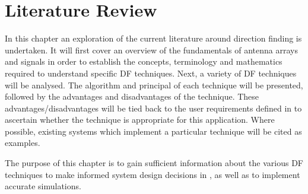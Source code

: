 \chapter{Literature Review}
\label{ch:lit-review}
In this chapter an exploration of the current literature around direction finding is undertaken.
It will first cover an overview of the fundamentals of antenna arrays and signals in order to establish the concepts, terminology and mathematics required to understand specific DF techniques. 
Next, a variety of DF techniques will be analysed. The algorithm and principal of each technique will be presented, followed by the advantages and disadvantages of the technique. 
These advantages/disadvantages will be tied back to the user requirements defined in  to ascertain whether the technique is appropriate for this application. Where possible, existing systems which implement a particular technique will be cited as examples.

The purpose of this chapter is to gain sufficient information about the various DF techniques to make informed system design decisions in , as well as to implement accurate simulations.




